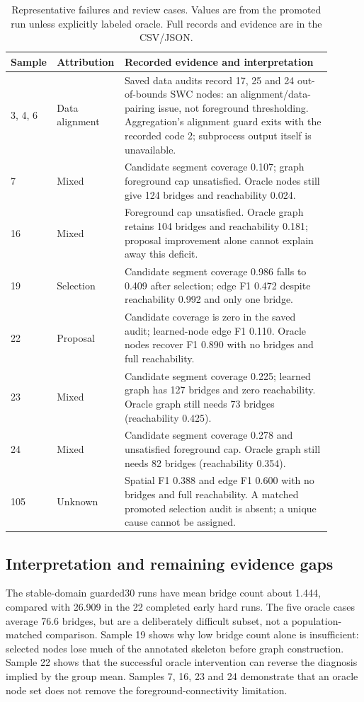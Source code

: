 \documentclass[11pt]{article}
\begin{document}
\begin{table}[htbp]
\centering
\small
\begin{tabular}{p{0.09\linewidth}p{0.17\linewidth}p{0.64\linewidth}}
\toprule
Sample & Attribution & Recorded evidence and interpretation \\
\midrule
3, 4, 6 & Data alignment & Saved data audits record 17, 25 and 24 out-of-bounds SWC nodes: an alignment/data-pairing issue, not foreground thresholding. Aggregation's alignment guard exits with the recorded code 2; subprocess output itself is unavailable. \\
7 & Mixed & Candidate segment coverage 0.107; graph foreground cap unsatisfied. Oracle nodes still give 124 bridges and reachability 0.024. \\
16 & Mixed & Foreground cap unsatisfied. Oracle graph retains 104 bridges and reachability 0.181; proposal improvement alone cannot explain away this deficit. \\
19 & Selection & Candidate segment coverage 0.986 falls to 0.409 after selection; edge F1 0.472 despite reachability 0.992 and only one bridge. \\
22 & Proposal & Candidate coverage is zero in the saved audit; learned-node edge F1 0.110. Oracle nodes recover F1 0.890 with no bridges and full reachability. \\
23 & Mixed & Candidate segment coverage 0.225; learned graph has 127 bridges and zero reachability. Oracle graph still needs 73 bridges (reachability 0.425). \\
24 & Mixed & Candidate segment coverage 0.278 and unsatisfied foreground cap. Oracle graph still needs 82 bridges (reachability 0.354). \\
105 & Unknown & Spatial F1 0.388 and edge F1 0.600 with no bridges and full reachability. A matched promoted selection audit is absent; a unique cause cannot be assigned. \\
\bottomrule
\end{tabular}
\caption{Representative failures and review cases. Values are from the promoted
run unless explicitly labeled oracle. Full records and evidence are in the CSV/JSON.}
\end{table}

\subsection{Interpretation and remaining evidence gaps}

The stable-domain guarded30 runs have mean bridge count about 1.444, compared
with 26.909 in the 22 completed early hard runs. The five oracle cases average
76.6 bridges, but are a deliberately difficult subset, not a population-matched
comparison. Sample 19 shows why low bridge count alone is insufficient: selected
nodes lose much of the annotated skeleton before graph construction. Sample 22
shows that the successful oracle intervention can reverse the diagnosis implied
by the group mean. Samples 7, 16, 23 and 24 demonstrate that an oracle node set
does not remove the foreground-connectivity limitation.
\end{document}

